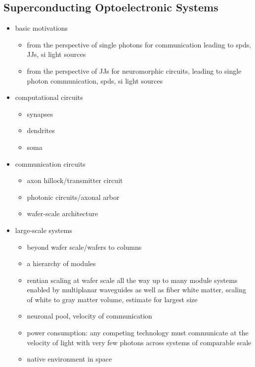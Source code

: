 \subsection{\label{sec:superconducting_optoelectronic}Superconducting Optoelectronic Systems}

\begin{itemize}

\item basic motivations
\begin{itemize}
\item from the perspective of single photons for communication leading to spds, JJs, si light sources
\item from the perspective of JJs for neuromorphic circuits, leading to single photon communication, spds, si light sources
\end{itemize}

\item computational circuits
\begin{itemize}
\item synapses
\item dendrites
\item soma
\end{itemize}

\item communication circuits
\begin{itemize}
\item axon hillock/transmitter circuit
\item photonic circuits/axonal arbor
\item wafer-scale architecture
\end{itemize}

\item large-scale systems
\begin{itemize}
\item beyond wafer scale/wafers to columns
\item a hierarchy of modules
\item rentian scaling at wafer scale all the way up to many module systems enabled by multiplanar waveguides as well as fiber white matter, scaling of white to gray matter volume, estimate for largest size
\item neuronal pool, velocity of communication
\item power consumption: any competing technology must communicate at the velocity of light with very few photons across systems of comparable scale
\item native environment in space
\end{itemize}

\end{itemize}

